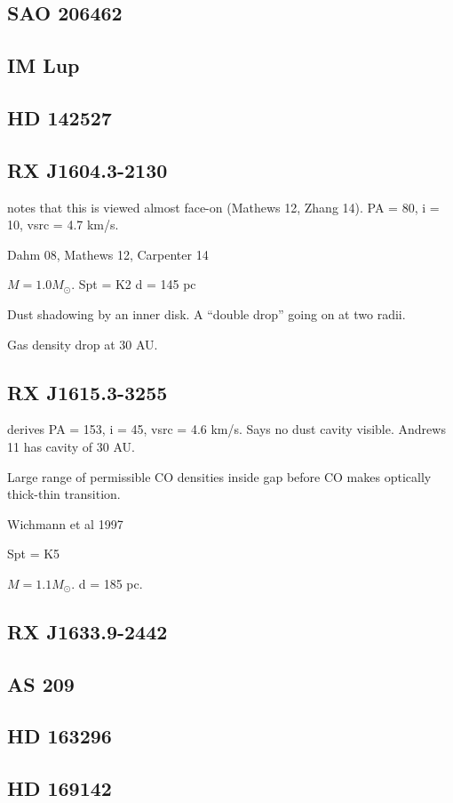 \documentclass[iop,floatfix,numberedappendix,twocolappendix]{emulateapj}
\begin{document}
\subsection{SAO 206462}

\subsection{IM Lup}

\subsection{HD 142527}

\subsection{RX J1604.3-2130}
\citep{vandermarel15} notes that this is viewed almost face-on (Mathews 12, Zhang 14). PA = 80, i = 10, vsrc = 4.7 km/s.

Dahm 08, Mathews 12, Carpenter 14

$M = 1.0 M_\odot$.
Spt = K2
d = 145 pc

Dust shadowing by an inner disk. A ``double drop'' going on at two radii.

Gas density drop at 30 AU.

\subsection{RX J1615.3-3255}
\citep{vandermarel15} derives PA = 153, i = 45, vsrc = 4.6 km/s. Says no dust cavity visible. Andrews 11 has cavity of 30 AU.

Large range of permissible CO densities inside gap before CO makes optically thick-thin transition.

\citep{andrews11}
Wichmann et al 1997

Spt = K5

$M = 1.1 M_\odot$.
d = 185 pc.

\subsection{RX J1633.9-2442}

\subsection{AS 209}

\subsection{HD 163296}

\subsection{HD 169142}
\end{document}
